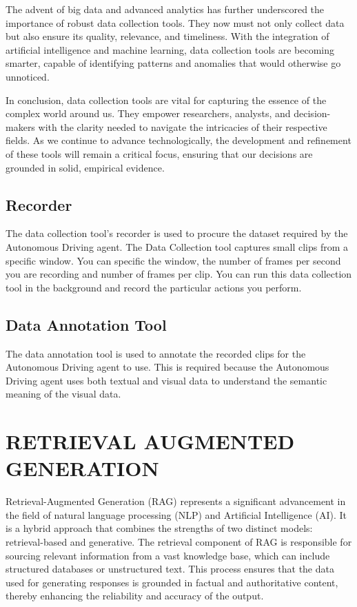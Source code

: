 \begin{spacing}{1.5}
\begin{sloppypar}
The advent of big data and advanced analytics has further underscored the importance of robust data collection tools. They now must not only collect data but also ensure its quality, relevance, and timeliness. With the integration of artificial intelligence and machine learning, data collection tools are becoming smarter, capable of identifying patterns and anomalies that would otherwise go unnoticed.

In conclusion, data collection tools are vital for capturing the essence of the complex world around us. They empower researchers, analysts, and decision-makers with the clarity needed to navigate the intricacies of their respective fields. As we continue to advance technologically, the development and refinement of these tools will remain a critical focus, ensuring that our decisions are grounded in solid, empirical evidence.

\subsection{Recorder}
The data collection tool's recorder is used to procure the dataset required by the Autonomous Driving agent. The Data Collection tool captures small clips from a specific window. You can specific the window, the number of frames per second you are recording and number of frames per clip. You can run this data collection tool in the background and record the particular actions you perform.
\subsection{Data Annotation Tool}
The data annotation tool is used to annotate the recorded clips for the Autonomous Driving agent to use. This is required because the Autonomous Driving agent uses both textual and visual data to understand the semantic meaning of the visual data.

    


\section{RETRIEVAL AUGMENTED GENERATION}

Retrieval-Augmented Generation (RAG) represents a significant advancement in the field of natural language processing (NLP) and Artificial Intelligence (AI). It is a hybrid approach that combines the strengths of two distinct models: retrieval-based and generative. The retrieval component of RAG is responsible for sourcing relevant information from a vast knowledge base, which can include structured databases or unstructured text. This process ensures that the data used for generating responses is grounded in factual and authoritative content, thereby enhancing the reliability and accuracy of the output.


\end{sloppypar}
\end{spacing}
